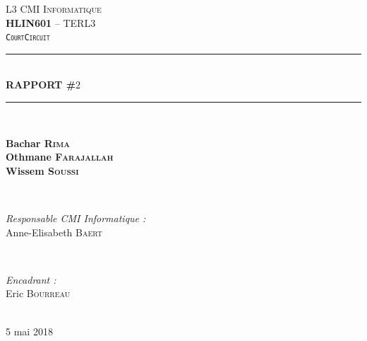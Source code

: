 \documentclass[a4paper,12pt]{report}
\newcommand{\HRule}{\rule{\linewidth}{0.5mm}}
\theoremstyle{break}
\theoremstyle{break}
\theoremstyle{break}
\theoremstyle{break}
\theoremstyle{definition}
\theoremstyle{remark}
\begin{document}
\begin{titlepage}
\textsc{\LARGE L3 CMI Informatique}\\[0.5cm]
\textsc{\Large \textbf{HLIN601} -- TERL3}\\[0.25cm]
\textsc{\Large \texttt{CourtCircuit}}\\[2cm]
\HRule \\[0.4cm]
{\huge \bfseries RAPPORT \#$2$}\\[0.1cm]
\HRule \\[2cm]
\begin{minipage}{0.5\textwidth}
\centering \large
\textbf{Bachar \textsc{Rima}}\\
\textbf{Othmane \textsc{Farajallah}}\\
\textbf{Wissem \textsc{Soussi}}
\end{minipage} \\[2cm]
\begin{minipage}[b]{0.5\textwidth}
\begin{flushleft} \large
\emph{Responsable CMI Informatique :} \\
Anne-Elisabeth \textsc{Baert} \\
\end{flushleft}
\end{minipage}
~
\begin{minipage}[b]{0.4\textwidth}
\begin{flushright} \large
\emph{Encadrant :}\\
Eric \textsc{Bourreau}
\end{flushright}
\end{minipage}\\[1.5cm]
{\large 5 mai 2018}\\[1cm]
\hspace{\fill}
\vfill %
\end{titlepage}
{
  \hypersetup{linkcolor=black}
  \tableofcontents
  \setcounter{page}{3}
}
\end{document}
